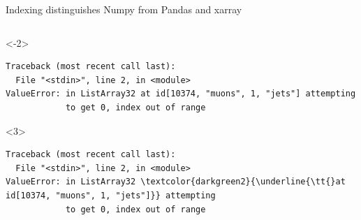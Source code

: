 \documentclass[aspectratio=169]{beamer}
\begin{document}
\begin{frame}[fragile]{Indexing distinguishes Numpy from Pandas and xarray}
\begin{columns}
\begin{uncoverenv}
\vspace{-0.5 cm}
\begin{onlyenv}<-2>
\begin{Verbatim}[commandchars=\\\{\}]
Traceback (most recent call last):
  File "<stdin>", line 2, in <module>
ValueError: in ListArray32 at id[10374, "muons", 1, "jets"] attempting
            to get 0, index out of range
\end{Verbatim}
\end{onlyenv}\begin{onlyenv}<3>
\begin{Verbatim}[commandchars=\\\{\}]
Traceback (most recent call last):
  File "<stdin>", line 2, in <module>
ValueError: in ListArray32 \textcolor{darkgreen2}{\underline{\tt{}at id[10374, "muons", 1, "jets"]}} attempting
            to get 0, index out of range
\end{Verbatim}
\end{onlyenv}
\end{uncoverenv}
\end{columns}
\end{frame}
\end{document}
